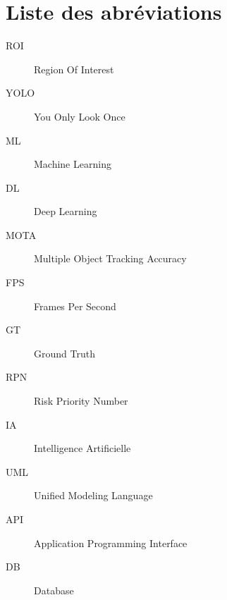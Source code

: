 \chapter*{Liste des abréviations}
\begin{description}
  \item[ROI] Region Of Interest
  \item[YOLO] You Only Look Once
  \item[ML] Machine Learning
  \item[DL] Deep Learning
  \item[MOTA] Multiple Object Tracking Accuracy
  \item[FPS] Frames Per Second
  \item[GT] Ground Truth
  \item[RPN] Risk Priority Number
  \item[IA] Intelligence Artificielle
  \item[UML] Unified Modeling Language
  \item[API] Application Programming Interface
  \item[DB] Database
\end{description}
